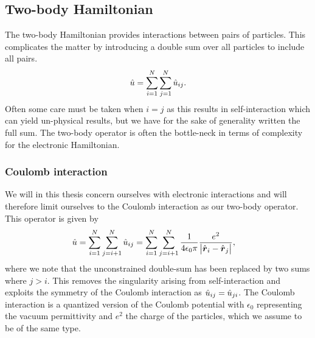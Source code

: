         \subsection{Two-body Hamiltonian}
            The two-body Hamiltonian provides interactions between pairs of
            particles.
            This complicates the matter by introducing a double sum over all
            particles to include all pairs.
            \begin{align}
                \hat{u}
                = \sum_{i = 1}^{N} \sum_{j = 1}^{N} \hat{u}_{ij}.
            \end{align}
            Often some care must be taken when $i = j$ as this results in
            self-interaction which can yield un-physical results, but we have
            for the sake of generality written the full sum.
            The two-body operator is often the bottle-neck in terms of
            complexity for the electronic Hamiltonian.

            \subsubsection{Coulomb interaction}
                We will in this thesis concern ourselves with electronic
                interactions and will therefore limit ourselves to the Coulomb
                interaction as our two-body operator.
                This operator is given by
                \begin{align}
                    \hat{u}
                    &= \sum_{i = 1}^{N}\sum_{j = i + 1}^{N}
                    \hat{u}_{ij}
                    = \sum_{i = 1}^{N}\sum_{j = i + 1}^{N}
                    \frac{1}{4\epsilon_0\pi}\frac{e^2}{\abs{\hat{\boldsymbol{r}}_i -
                    \hat{\boldsymbol{r}}_j}},
                \end{align}
                where we note that the unconstrained double-sum has been
                replaced by two sums where $j > i$.
                This removes the singularity arising from self-interaction and
                exploits the symmetry of the Coulomb interaction as
                $\hat{u}_{ij} = \hat{u}_{ji}$.
                The Coulomb interaction is a quantized version of the Coulomb
                potential with $\epsilon_0$ representing the vacuum
                permittivity and $e^2$ the charge of the particles, which we
                assume to be of the same type.

